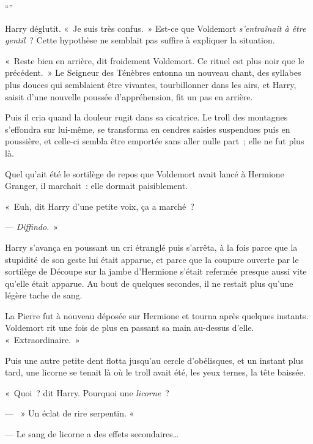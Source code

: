 “”

Harry déglutit. «~Je suis très confus.~» Est-ce que Voldemort \emph{s'entraînait à être gentil}~? Cette hypothèse ne semblait pas suffire à expliquer la situation.

«~Reste bien en arrière, dit froidement Voldemort. Ce rituel est plus noir que le précédent.~» Le Seigneur des Ténèbres entonna un nouveau chant, des syllabes plus douces qui semblaient être vivantes, tourbillonner dans les airs, et Harry, saisit d'une nouvelle poussée d'appréhension, fit un pas en arrière.

Puis il cria quand la douleur rugit dans sa cicatrice. Le troll des montagnes s'effondra sur lui-même, se transforma en cendres saisies suspendues puis en poussière, et celle-ci sembla être emportée sans aller nulle part~; elle ne fut plus là.

Quel qu'ait été le sortilège de repos que Voldemort avait lancé à Hermione Granger, il marchait~: elle dormait paisiblement.

«~Euh, dit Harry d'une petite voix, ça a marché~?

--- \emph{Diffindo.}~»

Harry s'avança en poussant un cri étranglé puis s'arrêta, à la fois parce que la stupidité de son geste lui était apparue, et parce que la coupure ouverte par le sortilège de Découpe sur la jambe d'Hermione s'était refermée presque aussi vite qu'elle était apparue. Au bout de quelques secondes, il ne restait plus qu'une légère tache de sang.

La Pierre fut à nouveau déposée sur Hermione et tourna après quelques instants. Voldemort rit une fois de plus en passant sa main au-dessus d'elle. «~Extraordinaire.~»

Puis une autre petite dent flotta jusqu'au cercle d'obélisques, et un instant plus tard, une licorne se tenait là où le troll avait été, les yeux ternes, la tête baissée.

«~Quoi~? dit Harry. Pourquoi une \emph{licorne}~?

--- ~» Un éclat de rire serpentin. «~

--- Le sang de licorne a des effets secondaires…

